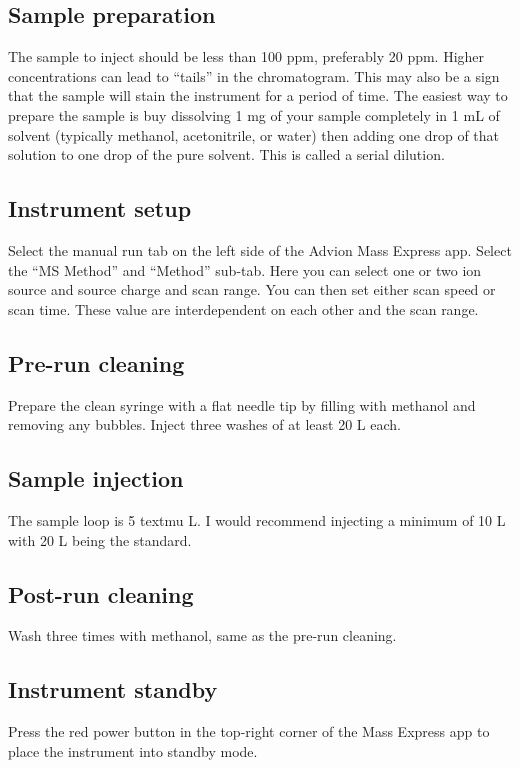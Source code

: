 \documentclass[12pt, letterpaper]{article}
\begin{document}
\subsection{Sample preparation}
The sample to inject should be less than 100 ppm, preferably 20 ppm. Higher concentrations can lead to ``tails'' in the chromatogram. 
This may also be a sign that the sample will stain the instrument for a period of time. 
The easiest way to prepare the sample is buy dissolving 1 mg of your sample completely in 1 mL of solvent (typically methanol, acetonitrile, or water) then adding one drop of that solution to one drop of the pure solvent. 
This is called a serial dilution.

\subsection{Instrument setup}
Select the manual run tab on the left side of the Advion Mass Express app.
Select the ``MS Method'' and ``Method'' sub-tab.
Here you can select one or two ion source and source charge and scan range.
You can then set either scan speed or scan time.
These value are interdependent on each other and the scan range.

\subsection{Pre-run cleaning}
Prepare the clean syringe with a flat needle tip by filling with methanol and removing any bubbles.
Inject three washes of at least 20 \textmu L each.

\subsection{Sample injection}
The sample loop is 5 textmu L.
I would recommend injecting a minimum of 10 \textmu L with 20 \textmu L being the standard.

\subsection{Post-run cleaning}
Wash three times with methanol, same as the pre-run cleaning.

\subsection{Instrument standby}
Press the red power button in the top-right corner of the Mass Express app to place the instrument into standby mode.
\end{document}
